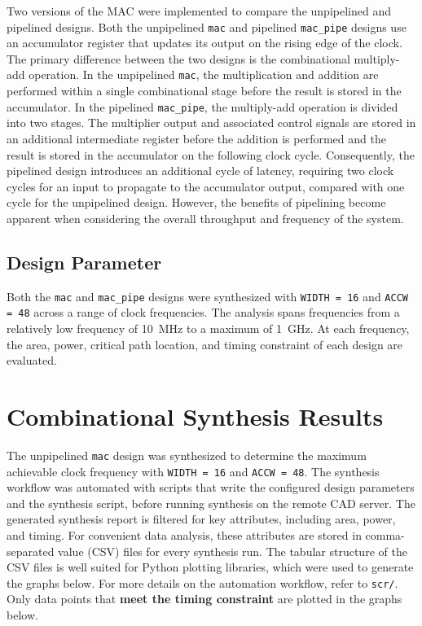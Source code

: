 \documentclass[a4paper,11pt]{article}
\begin{document}
Two versions of the MAC were implemented to compare the unpipelined and pipelined designs. Both the unpipelined \texttt{mac} and pipelined \texttt{mac\_pipe} designs use an accumulator register that updates its output on the rising edge of the clock. The primary difference between the two designs is the combinational multiply-add operation. In the unpipelined \texttt{mac}, the multiplication and addition are performed within a single combinational stage before the result is stored in the accumulator. In the pipelined \texttt{mac\_pipe}, the multiply-add operation is divided into two stages. The multiplier output and associated control signals are stored in an additional intermediate register before the addition is performed and the result is stored in the accumulator on the following clock cycle. Consequently, the pipelined design introduces an additional cycle of latency, requiring two clock cycles for an input to propagate to the accumulator output, compared with one cycle for the unpipelined design. However, the benefits of pipelining become apparent when considering the overall throughput and frequency of the system. 

\subsection{Design Parameter}
Both the \texttt{mac} and \texttt{mac\_pipe} designs were synthesized with \texttt{WIDTH = 16} and \texttt{ACCW = 48} across a range of clock frequencies. The analysis spans frequencies from a relatively low frequency of 10~MHz to a maximum of 1~GHz. At each frequency, the area, power, critical path location, and timing constraint of each design are evaluated.

\clearpage
\section{Combinational Synthesis Results}

The unpipelined \texttt{mac} design was synthesized to determine the maximum achievable clock frequency with \texttt{WIDTH = 16} and \texttt{ACCW = 48}. The synthesis workflow was automated with scripts that write the configured design parameters and the synthesis script, before running synthesis on the remote CAD server. The generated synthesis report is filtered for key attributes, including area, power, and timing. For convenient data analysis, these attributes are stored in comma-separated value (CSV) files for every synthesis run. The tabular structure of the CSV files is well suited for Python plotting libraries, which were used to generate the graphs below. For more details on the automation workflow, refer to \texttt{scr/}. Only data points that \textbf{meet the timing constraint} are plotted in the graphs below.
\end{document}
